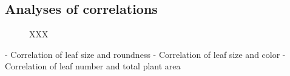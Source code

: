 \documentclass[paper=A4,bibliography=totocnumbered]{scrartcl}
\begin{document}
\subsection{Analyses of correlations}
\begin{figure}
	\centering
	\qquad
	\qquad
	\caption{XXX}
	\label{fig:corr}
\end{figure}

- Correlation of leaf size and roundness
- Correlation of leaf size and color
- Correlation of leaf number and total plant area
\end{document}
